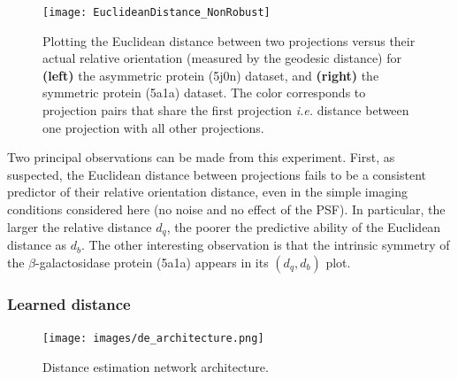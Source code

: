 \begin{figure}
    \centering
    \texttt{[image: EuclideanDistance\_NonRobust]}
    \caption{
        Plotting the Euclidean distance between two projections versus their actual relative orientation (measured by the geodesic distance) for \textbf{(left)} the asymmetric protein (5j0n) dataset, and \textbf{(right)} the symmetric protein (5a1a) dataset. The color corresponds to projection pairs that share the first projection \textit{i.e.} distance between one projection with all other projections.
    }
    \label{fig:euclidean-not-robust}
\end{figure}

Two principal observations can be made from this experiment.
First, as suspected, the Euclidean distance between projections fails to be a consistent predictor of their relative orientation distance, even in the simple imaging conditions considered here (no noise and no effect of the PSF).
In particular, the larger the relative distance $d_q$, the poorer the predictive ability of the Euclidean distance as $d_b$.
The other interesting observation is that the intrinsic symmetry of the $\beta$-galactosidase protein (5a1a) appears in its $(d_q,d_b)$ plot.

\subsubsection{Learned distance}\label{sec:results:distance-estimation:learned}

\begin{figure}
    \centering
    \texttt{[image: images/de\_architecture.png]}
    \caption{Distance estimation network architecture.}
    \label{fig:de-architecture}
\end{figure}


